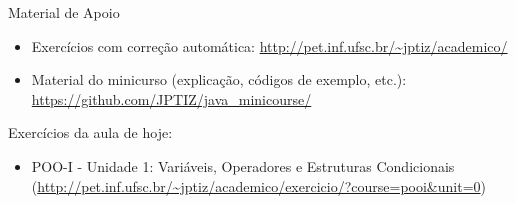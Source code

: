 \documentclass{beamer}
\begin{document}
\begin{frame}{Material de Apoio}
    \begin{itemize}
        \item Exercícios com correção automática:
            \url{http://pet.inf.ufsc.br/~jptiz/academico/}
        \item Material do minicurso (explicação, códigos de exemplo, etc.):
            \url{https://github.com/JPTIZ/java_minicourse/}
    \end{itemize}

    Exercícios da aula de hoje:
    \begin{itemize}
        \item POO-I - Unidade 1: Variáveis, Operadores e Estruturas
            Condicionais
            (\url{http://pet.inf.ufsc.br/~jptiz/academico/exercicio/?course=pooi&unit=0})
    \end{itemize}
\end{frame}
\end{document}
